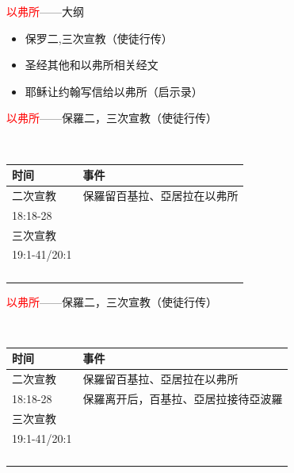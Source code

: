 \documentclass{beamer}
\begin{document}
\begin{frame}{\textcolor{red}{以弗所}——大纲}
\begin{itemize}
  \item 保罗二,三次宣教（使徒行传）
  \item 圣经其他和以弗所相关经文
  \item 耶稣让约翰写信给以弗所（启示录）
\end{itemize}
\end{frame}


\begin{frame}{\textcolor{red}{以弗所}——保羅二，三次宣教（使徒行传）}
\begin{block}{}\\
\begin{table}
\centering
\begin{tabular}{l|l}
时间 & 事件 \\\hline\hline
二次宣教&保羅留百基拉、亞居拉在以弗所 \\
18:18-28& \\\hline\hline
三次宣教& \\
19:1-41/20:1&\\
&\\
&\\
&\\
&\\\hline\hline
\end{tabular}
\end{table}
\end{block}
\end{frame}


\begin{frame}{\textcolor{red}{以弗所}——保羅二，三次宣教（使徒行传）}
\begin{block}{}\\
\begin{table}
\centering
\begin{tabular}{l|l}
时间 & 事件 \\\hline\hline
二次宣教&保羅留百基拉、亞居拉在以弗所 \\
18:18-28&保羅离开后，百基拉、亞居拉接待亞波羅 \\\hline\hline
三次宣教& \\
19:1-41/20:1&\\
&\\
&\\
&\\
&\\\hline\hline
\end{tabular}
\end{table}
\end{block}
\end{frame}
\end{document}
